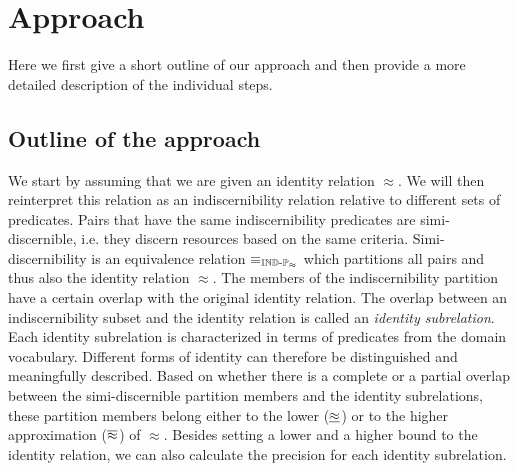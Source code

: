 \section{Approach}
\label{sec:approach}

Here we first give a short outline of our approach and then
  provide a more detailed description of the individual steps.

\subsection{Outline of the approach}

We start by assuming that we are given an identity relation $\approx$.
We will then reinterpret this relation as an indiscernibility relation
  relative to different sets of predicates.
Pairs that have the same indiscernibility predicates
  are simi-discernible, i.e. they discern resources
  based on the same criteria.
Simi-discernibility is an equivalence relation $\equiv_{\operatorname{{\mathbb{IND}-\mathbb{P}}}_{\approx}}$
  which partitions all pairs and thus also the identity relation $\approx$.
The members of the indiscernibility partition
  have a certain overlap with the original identity relation.
The overlap between an indiscernibility subset and the identity relation
  is called an \emph{identity subrelation}.
Each identity subrelation is characterized in terms of predicates
  from the domain vocabulary.
Different forms of identity can therefore be distinguished
  and meaningfully described.
Based on whether there is a complete or a partial overlap
  between the simi-discernible partition members and
  the identity subrelations,
  these partition members belong either to the lower ($\underline{\approx}$)
  or to the higher approximation ($\overline{\approx}$) of $\approx$.
Besides setting a lower and a higher bound to the identity relation,
  we can also calculate the precision for each identity subrelation.





